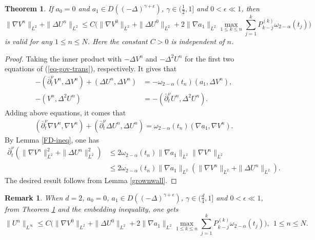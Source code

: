 \documentclass[11pt]{article}
\newtheorem{theorem}{Theorem}
\newtheorem{remark}{Remark}[section]
\numberwithin{equation}{section}
\begin{document}
\begin{theorem}\label{thm-stab-2}
If $a_0=0$ and $a_1\in D((-\Delta)^{\gamma+\epsilon})$, $\gamma\in(\frac{1}{2},1]$ and $0<\epsilon \ll 1$, then
\[
\|\nabla V^n\|_{L^2}+\|\Delta U^n\|_{L^2} \leq C\bigg(\|\nabla V^0\|_{L^2}+\|\Delta U^0\|_{L^2}+2\|\nabla a_1\|_{L^2}\max_{1\le k\le n}\sum_{j=1}^kP_{k-j}^{(k)}\omega_{2-\alpha}(t_j)\bigg)
\]
is valid for any $1\le n\le N$. Here the constant $C>0$ is independent of $n$.
\end{theorem}
\begin{proof}
Taking the inner product with $-\Delta V^n$ and $-\Delta^2 U^n$ for the first two equations of (\ref{eq-gov-trans}), respectively. It gives that
\begin{align*}
-(\bar\partial_t^\nu V^n,\Delta V^n) + (\Delta U^n,\Delta V^n) &= -\omega_{2-\alpha}(t_n)(a_1,\Delta V^n), \\
-(V^n,\Delta^2 U^n)  &= -(\bar\partial_t^\nu U^n,\Delta^2 U^n). 
\end{align*}
Adding above equations, it comes that
\begin{align*}
(\bar\partial_t^\nu \nabla V^n,\nabla V^n) + (\bar\partial_t^\nu \Delta U^n,\Delta U^n) = \omega_{2-\alpha}(t_n)(\nabla a_1,\nabla V^n).
\end{align*}
By Lemma \ref{FD-ineq}, one has
\begin{align*}
\bar\partial_t^\nu (\|\nabla V^n\|_{L^2}^2 + \|\Delta U^n\|_{L^2}^2) 
&\le 2\omega_{2-\alpha}(t_n)\|\nabla a_1\|_{L^2}\|\nabla V^n\|_{L^2}\\
&\le 2\omega_{2-\alpha}(t_n)\|\nabla a_1\|_{L^2}(\|\nabla V^n\|_{L^2}+\|\Delta U^n\|_{L^2}).
\end{align*}
The desired result follows from Lemma \ref{grownwall}.
\end{proof}

\begin{remark}
When $d=2$, $a_0=0$, $a_1\in D((-\Delta)^{\gamma+\epsilon})$, $\gamma\in(\frac{d}{4},1]$  and $0<\epsilon \ll 1$, from Theorem \ref{thm-stab-2} and the embedding inequality, one gets 
\[
\|U^n\|_{L^\infty} \leq C\bigg(\|\nabla V^0\|_{L^2}+\|\Delta U^0\|_{L^2}+2\|\nabla a_1\|_{L^2}\max_{1\le k\le n}\sum_{j=1}^kP_{k-j}^{(k)}\omega_{2-\alpha}(t_j)\bigg),~~1\le n\le N.
\]
\end{remark}
\end{document}
